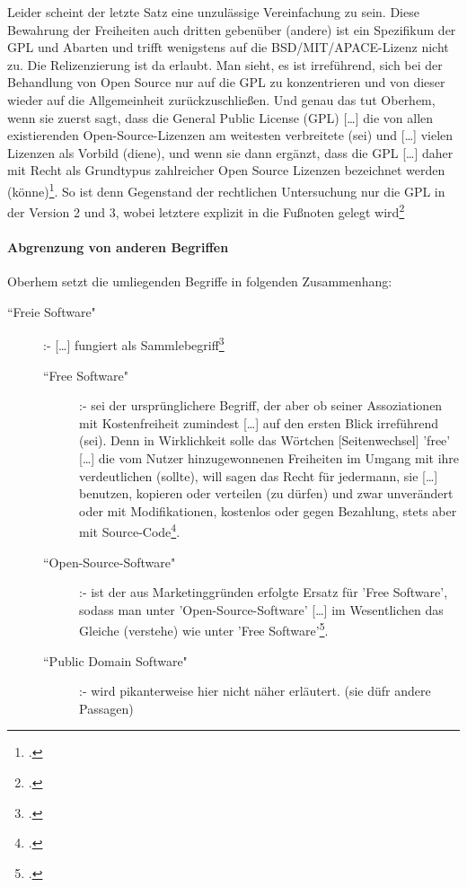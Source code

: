\documentclass[DIV=calc,BCOR=5mm,11pt,headings=small,oneside,abstract=true, toc=bib]{scrartcl}
\begin{document}
Leider scheint der letzte Satz eine unzulässige Vereinfachung zu sein. Diese
Bewahrung der Freiheiten auch dritten gebenüber (andere) ist ein Spezifikum der
GPL und Abarten und trifft wenigstens auf die BSD/MIT/APACE-Lizenz nicht zu. Die
Relizenzierung ist da erlaubt. Man sieht, es ist irreführend, sich bei der
Behandlung von Open Source nur auf die GPL zu konzentrieren und von dieser
wieder auf die Allgemeinheit zurückzuschließen. Und genau das tut Oberhem, wenn
sie zuerst sagt, dass \glqq{}die General Public License (GPL) [\ldots] die von
allen existierenden Open-Source-Lizenzen am weitesten verbreitete (sei)
und [\ldots] vielen Lizenzen als Vorbild (diene)\grqq{}, und wenn sie dann
ergänzt, dass die GPL \glqq{}[\ldots] daher mit Recht als Grundtypus
zahlreicher Open Source Lizenzen bezeichnet werden
(könne)\grqq{}\footcite[vgl.][33]{Oberhem2008a}. So ist denn Gegenstand der
rechtlichen Untersuchung nur die GPL in der Version 2 und 3, wobei letztere
explizit in die Fußnoten gelegt wird\footcite[vgl.][34]{Oberhem2008a}

\paragraph{Abgrenzung von anderen Begriffen}

Oberhem setzt die umliegenden Begriffe in folgenden Zusammenhang:

\begin{description}
  \item[``Freie Software"] :- \glqq{}[\ldots] fungiert als
  Sammlebegriff\grqq{}\footcite[vgl.][8]{Oberhem2008a}
  \begin{description}
    \item[``Free Software"] :- sei der ursprünglichere Begriff, der
    aber ob seiner Assoziationen mit \glqq{}Kostenfreiheit\grqq{} zumindest
    \glqq{}[\ldots] auf den ersten Blick irreführend (sei)\grqq{}. Denn in
    Wirklichkeit solle das Wörtchen [Seitenwechsel] 'free' \glqq{}[\ldots] die
    vom Nutzer hinzugewonnenen Freiheiten im Umgang mit ihre verdeutlichen
    (sollte)\grqq{}, will sagen das Recht für jedermann, sie \glqq{}[\ldots]
    benutzen, kopieren oder verteilen (zu dürfen)\grqq{} und zwar
    \glqq{}unverändert oder mit Modifikationen, kostenlos oder gegen 
    Bezahlung, stets aber mit
    Source-Code\grqq{}\footcite[vgl.][8f]{Oberhem2008a}.
    \item[``Open-Source-Software"] :- ist der \glqq{}aus
    Marketinggründen\grqq{} erfolgte Ersatz für 'Free Software', sodass man
    \glqq{}unter 'Open-Source-Software' [\ldots] im Wesentlichen das
    Gleiche (verstehe) wie unter 'Free
    Software'\grqq{}\footcite[vgl.][9]{Oberhem2008a}.
    \item[``Public Domain Software"] :- wird pikanterweise hier nicht
    näher erläutert. (sie düfr andere Passagen)
     
  \end{description}
\end{description}
\end{document}
